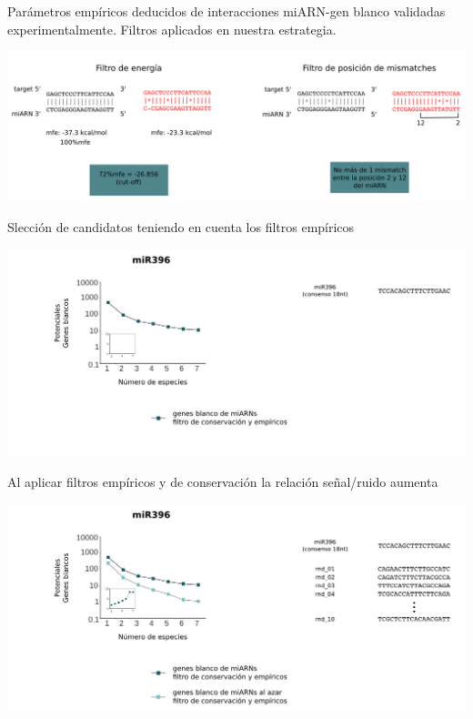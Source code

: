 \documentclass{beamer}
\begin{document}
\begin{frame}{Parámetros empíricos deducidos de interacciones miARN-gen blanco validadas experimentalmente. Filtros aplicados en nuestra estrategia.}
	\begin{center}
		\includegraphics[width=1\textwidth]{img/filtros_empiricos_02.png}
	\end{center}
\end{frame}


\begin{frame}{Slección de candidatos teniendo en cuenta los filtros empíricos}
	\begin{center}
		\includegraphics[width=1\textwidth]{img/NAR_fig2_03.png}
	\end{center}
\end{frame}

\begin{frame}{Al aplicar filtros empíricos y de conservación la relación señal/ruido aumenta}
	\begin{center}
		\includegraphics[width=1\textwidth]{img/NAR_fig2_04.png}
	\end{center}
\end{frame}
\end{document}
